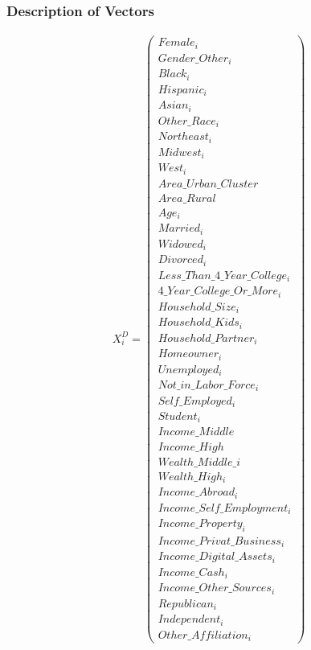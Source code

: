 \documentclass[11pt]{article}
\begin{document}
\subsubsection{Description of Vectors}
\label{sec:appendixvectors}
\pagebreak[0]\begin{center}
{\footnotesize
\[
\begin{array}{ccc}
X_i^{D} =
\left(
\begin{array}{c}
Female_i \\ Gender\_Other_i \\[0.2em]
Black_i \\ Hispanic_i \\ Asian_i \\ Other\_Race_i \\[0.2em]
Northeast_i \\ Midwest_i \\ West_i \\[0.2em]
Area\_Urban\_Cluster \\ Area\_Rural \\[0.2em]
Age_i \\[0.2em]
Married_i \\ Widowed_i \\ Divorced_i \\[0.2em]
Less\_Than\_4\_Year\_College_i \\ 4\_Year\_College\_Or\_More_i \\[0.2em]
Household\_Size_i \\ Household\_Kids_i \\ Household\_Partner_i \\[0.2em]
Homeowner_i \\
Unemployed_i \\ Not\_in\_Labor\_Force_i \\ Self\_Employed_i \\[0.2em]
Student_i \\[0.2em]
Income\_Middle \\ Income\_High \\[0.2em]
Wealth\_Middle\_i \\ Wealth\_High_i \\[0.2em]
Income\_Abroad_i \\ Income\_Self\_Employment_i \\ Income\_Property_i \\ Income\_Privat\_Business_i \\ Income\_Digital\_Assets_i \\ Income\_Cash_i \\ Income\_Other\_Sources_i \\[0.2em]
Republican_i \\ Independent_i \\ Other\_Affiliation_i
\end{array}
\right)


\end{array}\]}
\end{center}
\end{document}
